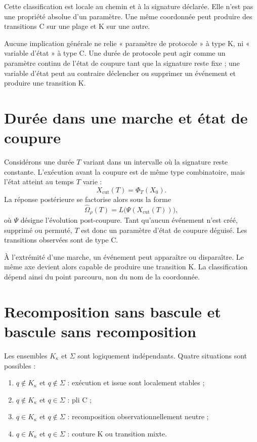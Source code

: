 Cette classification est locale au chemin et à la signature déclarée.
Elle n'est pas une propriété absolue d'un paramètre. Une même coordonnée
peut produire des transitions C sur une plage et K sur une autre.

\begin{encadre}[title={Corollaire \theproposition{} --- La nature de l'axe ne décide pas le type}]
Aucune implication générale ne relie « paramètre de protocole » à type K,
ni « variable d'état » à type C. Une durée de protocole peut agir comme
un paramètre continu de l'état de coupure tant que la signature reste
fixe ; une variable d'état peut au contraire déclencher ou supprimer un
événement et produire une transition K.
\end{encadre}

\section{Durée dans une marche et état de coupure}
\label{annexe-J-duree}

Considérons une durée $T$ variant dans un intervalle où la signature
reste constante. L'exécution avant la coupure est de même type
combinatoire, mais l'état atteint au temps $T$ varie :
\[
X_{\mathrm{cut}}(T)=\Phi_T(X_0).
\]
La réponse postérieure se factorise alors sous la forme
\[
\widehat\Omega_\rho(T)
=
L\bigl(\Psi(X_{\mathrm{cut}}(T))\bigr),
\]
où $\Psi$ désigne l'évolution post-coupure. Tant qu'aucun événement
n'est créé, supprimé ou permuté, $T$ est donc un paramètre d'état de
coupure déguisé. Les transitions observées sont de type C.

À l'extrémité d'une marche, un événement peut apparaître ou disparaître.
Le même axe devient alors capable de produire une transition K. La
classification dépend ainsi du point parcouru, non du nom de la
coordonnée.

\section{Recomposition sans bascule et bascule sans recomposition}
\label{annexe-J-independance}

Les ensembles $K_\kappa$ et $\Sigma$ sont logiquement indépendants.
Quatre situations sont possibles :
\begin{enumerate}
\item $q\notin K_\kappa$ et $q\notin\Sigma$ : exécution et issue sont
localement stables ;
\item $q\notin K_\kappa$ et $q\in\Sigma$ : pli C ;
\item $q\in K_\kappa$ et $q\notin\Sigma$ : recomposition
observationnellement neutre ;
\item $q\in K_\kappa$ et $q\in\Sigma$ : couture K ou transition mixte.
\end{enumerate}

